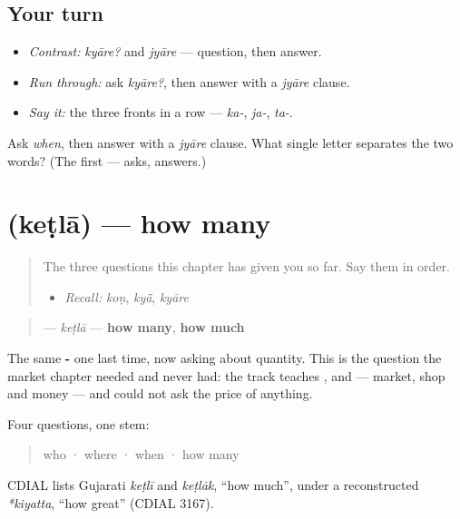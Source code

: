 \subsection*{Your turn}
\begin{itemize}
\raggedright
  \item \emph{Contrast:} \emph{kyāre?} and \emph{jyāre} — question, then answer.
  \item \emph{Run through:} ask \emph{kyāre?}, then answer with a \emph{jyāre} clause.
  \item \emph{Say it:} the three fronts in a row — \emph{ka-}, \emph{ja-}, \emph{ta-}.
\end{itemize}

\begin{tcolorbox}[breakable,colback=teal!4,colframe=teal!35!black,title={Before you move on}]
Ask \emph{when}, then answer with a \emph{jyāre} clause. What single letter separates the two words? (The first — \textbf{} asks, \textbf{} answers.)
\end{tcolorbox}
\section[\texorpdfstring{\gu{કેટલા} (keṭlā)}{કેટલા (keṭlā)}]{ (keṭlā) — how many}

\label{lesson:GU-C37-ketla}



\begin{quote}
The three questions this chapter has given you so far. Say them in order.

\begin{itemize}
\raggedright
  \item \emph{Recall:} \emph{koṇ}, \emph{kyā̃}, \emph{kyāre}
\end{itemize}
\end{quote}

\begin{cousinweb}
\begin{quote}
\textbf{} — \emph{keṭlā} — \textbf{how many}, \textbf{how much}
\end{quote}

The same \textbf{-} one last time, now asking about quantity. This is the question the market chapter needed and never had: the track teaches \textbf{}, \textbf{} and \textbf{} — market, shop and money — and could not ask the price of anything.

Four questions, one stem:

\begin{quote}
\textbf{} who · \textbf{} where · \textbf{} when · \textbf{} how many
\end{quote}

CDIAL lists Gujarati \emph{keṭlī} and \emph{keṭlāk}, \textquotedblleft{}how much\textquotedblright{}, under a reconstructed \emph{*kiyatta}, \textquotedblleft{}how great\textquotedblright{} (CDIAL 3167).
\end{cousinweb}

